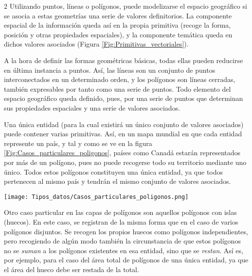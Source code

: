 \begin{multicols}{2}
Utilizando puntos, líneas o polígonos, puede modelizarse el espacio geográfico si se asocia a estas geometrías una serie de valores definitorios. La componente espacial de la información queda así en la propia primitiva (recoge la forma, posición y otras propiedades espaciales), y la componente temática queda en dichos valores asociados (Figura \ref{Fig:Primitivas_vectoriales}).

A la hora de definir las formas geométricas básicas, todas ellas pueden reducirse en última instancia a puntos. Así, las líneas son un conjunto de puntos interconectados en un determinado orden, y los polígonos son líneas cerradas, también expresables por tanto como una serie de puntos. Todo elemento del espacio geográfico queda definido, pues, por una serie de puntos que determinan sus propiedades espaciales y una serie de valores asociados.

Una única entidad (para la cual existirá un único conjunto de valores asociados) puede contener varias primitivas. Así, en un mapa mundial en que cada entidad represente un país, y tal y como se ve en la figura \ref{Fig:Casos_particulares_poligonos}, países como Canadá estarán representados por más de un polígono, pues no puede recogerse todo su territorio mediante uno único. Todos estos polígonos constituyen una única entidad, ya que todos pertenecen al mismo país y tendrán el mismo conjunto de valores asociados.

\begin{figure*}[ht]
\centering
\texttt{[image: Tipos\_datos/Casos\_particulares\_poligonos.png]}
\caption{\small Casos particulares de polígonos: a) varios polígonos disjuntos en una misma entidad (en este caso, mismo país), b) Polígonos con islas (huecos).}
\label{Fig:Casos_particulares_poligonos} 
\end{figure*}


Otro caso particular en las capas de polígonos son aquellos polígonos con islas (huecos). En este caso, se registran de la misma forma que en el caso de varios polígonos disjuntos. Se recogen los propios huecos como polígonos independientes, pero recogiendo de algún modo también la circunstancia de que estos polígonos no se \emph{suman} a los polígonos existentes en esa entidad, sino que se \emph{restan}. Así es, por ejemplo, para el caso del área total de polígonos de una única entidad, ya que el área del hueco debe ser restada de la total.


\end{multicols}
